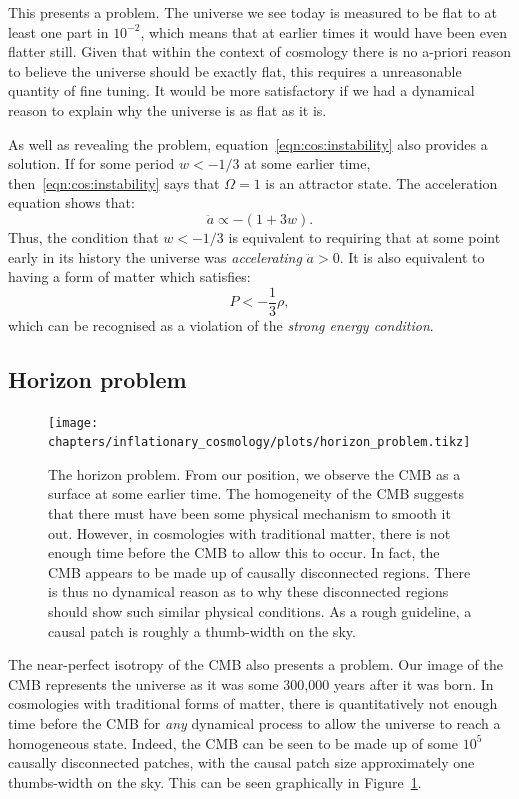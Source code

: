 This presents a problem. The universe we see today is measured to be flat to at least one part in $10^{-2}$, which means that at earlier times it would have been even flatter still. Given that within the context of cosmology there is no a-priori reason to believe the universe should be exactly flat, this requires a unreasonable quantity of fine tuning. It would be more satisfactory if we had a dynamical reason to explain why the universe is as flat as it is.

As well as revealing the problem, equation~\eqref{eqn:cos:instability} also provides a solution. If for some period $w<-1/3$ at some earlier time, then~\eqref{eqn:cos:instability} says that $\Omega=1$ is an attractor state. The acceleration equation shows that:
\begin{equation}
  \ddot{a} \propto -(1+3w).
  \label{eqn:cos:Raychaudhuri_acc}
\end{equation}
Thus, the condition that $w<-1/3$ is equivalent to requiring that at some point early in its history the universe was {\em accelerating\/} $\ddot{a}>0$. It is also equivalent to having a form of matter which satisfies:
\begin{equation}
  P < -\frac{1}{3}\rho,
  \label{eqn:cos:SEC_violation}
\end{equation}
which can be recognised as a violation of the {\em strong energy condition}.

\subsection{Horizon problem}
\begin{figure}[tp]
  \centering
  \texttt{[image: chapters/inflationary\_cosmology/plots/horizon\_problem.tikz]}
  \caption{The horizon problem. From our position, we observe the CMB as a surface at some earlier time. The homogeneity of the CMB suggests that there must have been some physical mechanism to smooth it out. However, in cosmologies with traditional matter, there is not enough time before the CMB to allow this to occur. In fact, the CMB appears to be made up of causally disconnected regions. There is thus no dynamical reason as to why these disconnected regions should show such similar physical conditions. As a rough guideline, a causal patch is roughly a thumb-width on the sky.}\label{fig:cos:horizon_problem}
\end{figure}
The near-perfect isotropy of the CMB also presents a problem. Our image of the CMB represents the universe as it was some 300,000 years after it was born. In cosmologies with traditional forms of matter, there is quantitatively not enough time before the CMB for {\em any\/} dynamical process to allow the universe to reach a homogeneous state. Indeed, the CMB can be seen to be made up of some $10^{5}$ causally disconnected patches, with the causal patch size approximately one thumbs-width on the sky. This can be seen graphically in Figure~\ref{fig:cos:horizon_problem}.

